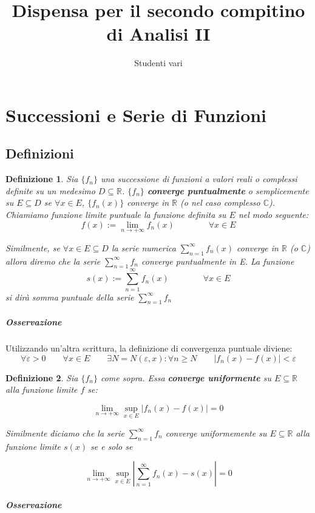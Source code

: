 \documentclass[a4paper,12pt]{article}
\newtheorem{defi}{Definizione}
\begin{document}
\begin{titlepage}
\title{Dispensa per il secondo compitino di Analisi II}
\author{Studenti vari}
\maketitle
\end{titlepage}

\begin{titlepage}
\tableofcontents
\end{titlepage}

\section{Successioni e Serie di Funzioni}
\subsection{Definizioni}
\begin{defi}
Sia $\{ f_n\} $  una successione di funzioni a valori reali o complessi definite su un medesimo $D \subseteq \mathbb{R}$.
 $\{ f_n\} $ \textbf{converge puntualmente} o semplicemente su $ E \subseteq D $ se $\forall x \in E$, $\{f_n(x)\}$ converge in $\mathbb{R}$ (o nel caso complesso $\mathbb{C}$). Chiamiamo funzione limite puntuale la funzione definita su $E$ nel modo seguente: 
 $$f(x):=\lim_{n\to+\infty} f_n(x) \qquad \qquad \forall x \in E $$

Similmente, se $\forall x \in E \subseteq D$ la serie numerica $\sum_{n=1}^{\infty} f_n(x)$ converge in $\mathbb{R}$ (o $\mathbb{C}$)  allora diremo che la serie  $\sum_{n=1}^{\infty} f_n$ converge puntualmente in E. La funzione
\begin{displaymath}
s(x):= \sum_{n=1}^{\infty} f_n(x) \qquad \qquad \forall x \in E
\end{displaymath}
si dirà somma puntuale della serie $\sum_{n=1}^{\infty} f_n$
\end{defi}


\subparagraph*{Osservazione}
Utilizzando un'altra scrittura, la definizione di convergenza puntuale diviene:
 $$\forall \varepsilon>0\qquad \forall x \in E\qquad\exists N=N(\varepsilon, x): \forall n \geq N\qquad |f_n(x) - f(x)| < \varepsilon$$ 
\begin{defi}
Sia $\{ f_n\} $ come sopra. Essa \textbf{ converge uniformente} su $E \subseteq \mathbb{R} $ alla funzione limite $f$ se:
 
$$ \lim_{n\to+\infty} \displaystyle \sup_{x \in E} |f_n\left(x\right)-f\left(x\right)| = 0$$


Similmente diciamo che la serie $\sum_{n=1}^{\infty} f_n$ converge uniformemente su $E \subseteq \mathbb{R} $ alla funzione limite $s(x)$ se e solo se

$$ \lim_{n\to+\infty}  \sup_{x \in E} \displaystyle \left|\sum_{n=1}^{\infty} f_n(x)-s(x)\right| = 0 $$

\end{defi}
\subparagraph*{Osservazione}
 
\end{document}
